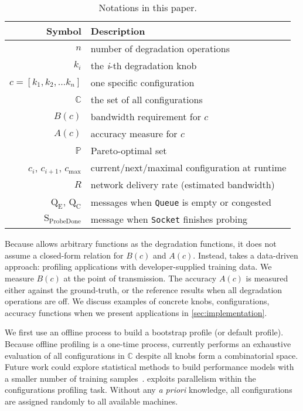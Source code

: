\begin{table}
  \footnotesize
  \centering
  \begin{tabular}{r l}
    \toprule
    \textbf{Symbol} & \textbf{Description} \\
    \midrule
    $n$ & number of degradation operations \\
    $k_i$ & the \textit{i}-th degradation knob \\
    $c = [k_{1}, k_{2}, ... k_{n}]$ & one specific configuration \\
    $\mathbb{C}$ & the set of all configurations \\
    \midrule
    $B(c)$ & bandwidth requirement for $c$ \\
    $A(c)$ & accuracy measure for $c$ \\
    $\mathbb{P}$ & Pareto-optimal set \\
    \midrule
    $c_i$, $c_{i+1}$, $c_{\max}$ & current/next/maximal configuration at runtime \\
    $R$ & network delivery rate (estimated bandwidth) \\
    $\text{Q}_\text{E}$, $\text{Q}_\text{C}$ & messages when \texttt{Queue} is empty or congested \\
    $\text{S}_\text{ProbeDone}$ & message when \texttt{Socket} finishes probing \\
    \bottomrule
  \end{tabular}
  \caption{Notations in this paper.}
  \label{tab:notations}
\end{table}

Because \sysname{} allows arbitrary functions as the degradation functions, it
does not assume a closed-form relation for $B(c)$ and $A(c)$. Instead,
\sysname{} takes a data-driven approach: profiling applications with
developer-supplied training data.  We measure $B(c)$ at the point of
transmission. The accuracy $A(c)$ is measured either against the ground-truth,
or the reference results when all degradation operations are off.  We discuss
examples of concrete knobs, configurations, accuracy functions when we present
applications in \autoref{sec:implementation}.

 We first use an offline process to build a bootstrap
profile (or default profile). Because offline profiling is a one-time process,
\sysname{} currently performs an exhaustive evaluation of all configurations in
$\mathbb{C}$ despite all knobs form a combinatorial space. Future work could
explore statistical methods to build performance models with a smaller number of
training samples~\cite{venkataraman2016ernest,
  alipourfard2017cherrypick}. \sysname{} exploits parallelism within the
configurations profiling task. Without any \textit{a priori} knowledge, all
configurations are assigned randomly to all available machines.

